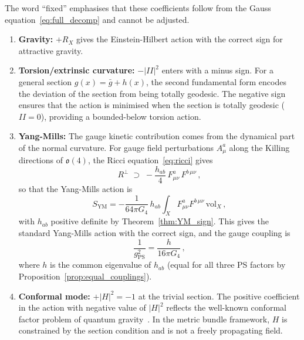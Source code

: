 \documentclass[12pt,a4paper]{article}
\theoremstyle{definition}
\begin{document}
\noindent
The word ``fixed'' emphasises that these coefficients follow from the Gauss equation~\eqref{eq:full_decomp} and cannot be adjusted.

\begin{enumerate}
\item \textbf{Gravity:} $+R_X$ gives the Einstein-Hilbert action with the correct sign for attractive gravity.

\item \textbf{Torsion/extrinsic curvature:} $-|II|^2$ enters with a minus sign.
For a general section $g(x) = \bar{g} + h(x)$, the second fundamental form encodes the deviation of the section from being totally geodesic.
The negative sign ensures that the action is minimised when the section is totally geodesic ($II = 0$), providing a bounded-below torsion action.

\item \textbf{Yang-Mills:} The gauge kinetic contribution comes from the dynamical part of the normal curvature.
For gauge field perturbations $A^a_\mu$ along the Killing directions of $\mathfrak{o}(4)$, the Ricci equation~\eqref{eq:ricci} gives
\begin{equation}
\label{eq:YM_from_Rperp}
R^\perp \;\supset\; -\frac{h_{ab}}{4}\, F^a_{\mu\nu}\, F^{b\,\mu\nu}\,,
\end{equation}
so that the Yang-Mills action is
\begin{equation}
\label{eq:YM_final}
S_{\mathrm{YM}} = -\frac{1}{64\pi G_4}\, h_{ab} \int_X F^a_{\mu\nu} F^{b\,\mu\nu}\, \mathrm{vol}_X\,,
\end{equation}
with $h_{ab}$ positive definite by Theorem~\ref{thm:YM_sign}.
This gives the standard Yang-Mills action with the correct sign, and the gauge coupling is
\begin{equation}
\frac{1}{g^2_{\mathrm{PS}}} = \frac{h}{16\pi G_4}\,,
\end{equation}
where $h$ is the common eigenvalue of $h_{ab}$ (equal for all three PS factors by Proposition~\ref{prop:equal_couplings}).

\item \textbf{Conformal mode:} $+|H|^2 = -1$ at the trivial section.
The positive coefficient in the action with negative value of $|H|^2$ reflects the well-known conformal factor problem of quantum gravity~\cite{Giulini2009}.
In the metric bundle framework, $H$ is constrained by the section condition and is not a freely propagating field.
\end{enumerate}
\end{document}
